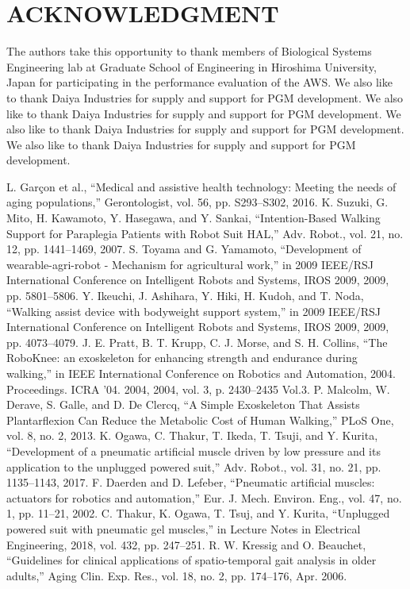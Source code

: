 \documentclass[letterpaper, 10 pt, conference]{ieeeconf}  %
\begin{document}
\section*{ACKNOWLEDGMENT}

The authors take this opportunity to thank members of Biological Systems Engineering lab at Graduate School of Engineering in Hiroshima University, Japan for participating in the performance evaluation of the AWS. We also like to thank Daiya Industries for supply and support for PGM development.   We also like to thank Daiya Industries for supply and support for PGM development.  We also like to thank Daiya Industries for supply and support for PGM development.   We also like to thank Daiya Industries for supply and support for PGM development.    


\begin{thebibliography}{10}

	L. Garçon et al., “Medical and assistive health technology: Meeting the needs of aging populations,” Gerontologist, vol. 56, pp. S293–S302, 2016.
	K. Suzuki, G. Mito, H. Kawamoto, Y. Hasegawa, and Y. Sankai, “Intention-Based Walking Support for Paraplegia Patients with Robot Suit HAL,” Adv. Robot., vol. 21, no. 12, pp. 1441–1469, 2007.
	S. Toyama and G. Yamamoto, “Development of wearable-agri-robot - Mechanism for agricultural work,” in 2009 IEEE/RSJ International Conference on Intelligent Robots and Systems, IROS 2009, 2009, pp. 5801–5806.
	Y. Ikeuchi, J. Ashihara, Y. Hiki, H. Kudoh, and T. Noda, “Walking assist device with bodyweight support system,” in 2009 IEEE/RSJ International Conference on Intelligent Robots and Systems, IROS 2009, 2009, pp. 4073–4079.
	J. E. Pratt, B. T. Krupp, C. J. Morse, and S. H. Collins, “The RoboKnee: an exoskeleton for enhancing strength and endurance during walking,” in IEEE International Conference on Robotics and Automation, 2004. Proceedings. ICRA ’04. 2004, 2004, vol. 3, p. 2430–2435 Vol.3.
	P. Malcolm, W. Derave, S. Galle, and D. De Clercq, “A Simple Exoskeleton That Assists Plantarflexion Can Reduce the Metabolic Cost of Human Walking,” PLoS One, vol. 8, no. 2, 2013.
	K. Ogawa, C. Thakur, T. Ikeda, T. Tsuji, and Y. Kurita, “Development of a pneumatic artificial muscle driven by low pressure and its application to the unplugged powered suit,” Adv. Robot., vol. 31, no. 21, pp. 1135–1143, 2017.
	F. Daerden and D. Lefeber, “Pneumatic artificial muscles: actuators for robotics and automation,” Eur. J. Mech. Environ. Eng., vol. 47, no. 1, pp. 11–21, 2002.
	C. Thakur, K. Ogawa, T. Tsuj, and Y. Kurita, “Unplugged powered suit with pneumatic gel muscles,” in Lecture Notes in Electrical Engineering, 2018, vol. 432, pp. 247–251.
R. W. Kressig and O. Beauchet, “Guidelines for clinical applications of spatio-temporal gait analysis in older adults,” Aging Clin. Exp. Res., vol. 18, no. 2, pp. 174–176, Apr. 2006.


\end{thebibliography}
\end{document}
